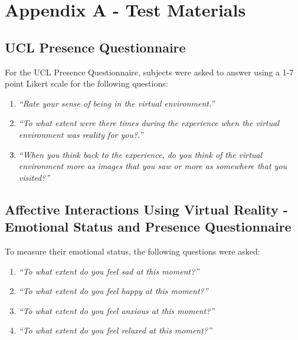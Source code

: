 \documentclass{sigchi}
\newcommand{\inlinequote}[1]{\textit{``#1''}}
\begin{document}
%
%
%
%
%
\balance{}

\balance{}




\appendix
\section{Appendix A - Test Materials}
\subsection{UCL Presence Questionnaire}
For the UCL Presence Questionnaire, subjects were asked to answer using a 1-7 point Likert scale for the following questions:
\begin{enumerate}
	\item{\inlinequote{Rate your sense of being in the virtual environment.}}
	\item{\inlinequote{To what extent were there times during the experience when the virtual environment was reality for you?.}}
	\item{\inlinequote{When you think back to the experience, do you think of the virtual environment more as images that you saw or more	as somewhere that you visited?}}
	\end{enumerate}

\subsection{Affective Interactions Using Virtual Reality - Emotional Status and Presence Questionnaire}
To measure their emotional status, the following questions were asked:
\begin{enumerate}
	\item{\inlinequote{To what extent do you feel sad at this moment?}}
	\item{\inlinequote{To what extent do you feel happy at this	moment?}}
	\item{\inlinequote{To what extent do you feel anxious at this moment?}}
	\item{\inlinequote{To what extent do you feel relaxed at this moment?}}
\end{enumerate}
\end{document}
